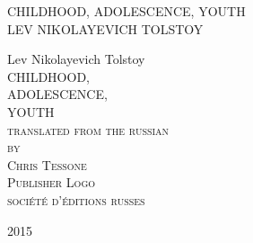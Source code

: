 
\newlength{\drop}\setlength{\drop}{0.12\textheight}

\newcommand*{\firsttitle}{\begingroup
\centering
\vspace*{3em}
{\Large CHILDHOOD, ADOLESCENCE, YOUTH}\\[\baselineskip]
{\Large LEV NIKOLAYEVICH TOLSTOY}
\vfill\null
\endgroup}

\newcommand*{\titleAM}{\begingroup
\centering
\vspace*{\drop}
{\large Lev Nikolayevich Tolstoy}\\[\baselineskip]
{\Huge CHILDHOOD,}\\[\baselineskip]
{\Huge ADOLESCENCE,}\\[\baselineskip]
{\Huge YOUTH}\\[\baselineskip]
{\scshape translated from the russian}\\
{\scshape by}\\
{\scshape Chris Tessone}\\[\drop]
{\scshape Publisher Logo}\\[0.5\baselineskip]
{\small\scshape soci\'et\'e d'\'editions russes}\par
{\small\scshape 2015}\par
\vfill\null
\endgroup}

\firsttitle
\thispagestyle{empty}
\clearpage

\newpage\null\thispagestyle{empty}\newpage

\titleAM
\thispagestyle{empty}
\clearpage 

